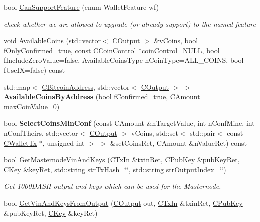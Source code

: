 \begin{DoxyCompactItemize}
\mbox{\label{class_c_wallet_a83766f3d6797dba08c5ea136fa417c4d}} 
bool \mbox{\hyperlink{class_c_wallet_a83766f3d6797dba08c5ea136fa417c4d}{Can\+Support\+Feature}} (enum Wallet\+Feature wf)
\begin{DoxyCompactList}\small\item\em check whether we are allowed to upgrade (or already support) to the named feature \end{DoxyCompactList}\item 
void \mbox{\hyperlink{group___actions_ga8110e889be0f5915104e07bfe3839c68}{Available\+Coins}} (std\+::vector$<$ \mbox{\hyperlink{class_c_output}{C\+Output}} $>$ \&v\+Coins, bool f\+Only\+Confirmed=true, const \mbox{\hyperlink{class_c_coin_control}{C\+Coin\+Control}} $\ast$coin\+Control=N\+U\+LL, bool f\+Include\+Zero\+Value=false, Available\+Coins\+Type n\+Coin\+Type=A\+L\+L\+\_\+\+C\+O\+I\+NS, bool f\+Use\+IX=false) const
\item 
std\+::map$<$ \mbox{\hyperlink{class_c_bitcoin_address}{C\+Bitcoin\+Address}}, std\+::vector$<$ \mbox{\hyperlink{class_c_output}{C\+Output}} $>$ $>$ {\bfseries Available\+Coins\+By\+Address} (bool f\+Confirmed=true, C\+Amount max\+Coin\+Value=0)
\item 
bool {\bfseries Select\+Coins\+Min\+Conf} (const C\+Amount \&n\+Target\+Value, int n\+Conf\+Mine, int n\+Conf\+Theirs, std\+::vector$<$ \mbox{\hyperlink{class_c_output}{C\+Output}} $>$ v\+Coins, std\+::set$<$ std\+::pair$<$ const \mbox{\hyperlink{class_c_wallet_tx}{C\+Wallet\+Tx}} $\ast$, unsigned int $>$ $>$ \&set\+Coins\+Ret, C\+Amount \&n\+Value\+Ret) const
\item 
bool \mbox{\hyperlink{group__map_wallet_ga4deb7baa65e036149f7d19b3aefe7323}{Get\+Masternode\+Vin\+And\+Keys}} (\mbox{\hyperlink{class_c_tx_in}{C\+Tx\+In}} \&txin\+Ret, \mbox{\hyperlink{class_c_pub_key}{C\+Pub\+Key}} \&pub\+Key\+Ret, \mbox{\hyperlink{class_c_key}{C\+Key}} \&key\+Ret, std\+::string str\+Tx\+Hash=\char`\"{}\char`\"{}, std\+::string str\+Output\+Index=\char`\"{}\char`\"{})
\begin{DoxyCompactList}\small\item\em Get 1000D\+A\+SH output and keys which can be used for the Masternode. \end{DoxyCompactList}\item 
bool \mbox{\hyperlink{group__map_wallet_ga7621515b3195b8c8fb130c509725c9f2}{Get\+Vin\+And\+Keys\+From\+Output}} (\mbox{\hyperlink{class_c_output}{C\+Output}} out, \mbox{\hyperlink{class_c_tx_in}{C\+Tx\+In}} \&txin\+Ret, \mbox{\hyperlink{class_c_pub_key}{C\+Pub\+Key}} \&pub\+Key\+Ret, \mbox{\hyperlink{class_c_key}{C\+Key}} \&key\+Ret)

\end{DoxyCompactItemize}
